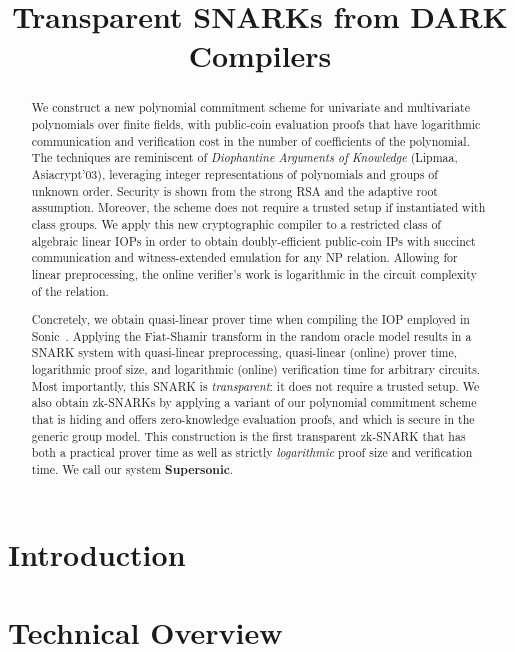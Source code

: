 \documentclass{llncs}
\date{}
\begin{document}
\title{Transparent SNARKs from DARK Compilers}
\author{}
\institute{}
\maketitle

\begin{abstract} 
We construct a new polynomial commitment scheme for univariate and multivariate polynomials over finite fields, with public-coin evaluation proofs that have logarithmic communication and verification cost in the number of coefficients of the polynomial. The techniques are reminiscent of \emph{Diophantine Arguments of Knowledge} (Lipmaa, Asiacrypt'03), leveraging integer representations of polynomials and groups of unknown order. Security is shown from the strong RSA and the adaptive root assumption. Moreover, the scheme does not require a trusted setup if instantiated with class groups. We apply this new cryptographic compiler to a restricted class of algebraic linear IOPs in order to obtain doubly-efficient public-coin IPs with succinct communication and witness-extended emulation for any NP relation. Allowing for linear preprocessing, the online verifier's work is logarithmic in the circuit complexity of the relation.

Concretely, we obtain quasi-linear prover time when compiling the IOP employed in Sonic~\cite{Sonic}. Applying the Fiat-Shamir transform in the random oracle model results in a SNARK system with quasi-linear preprocessing, quasi-linear (online) prover time, logarithmic proof size, and logarithmic (online) verification time for arbitrary circuits. Most importantly, this SNARK is \emph{transparent}: it does not require a trusted setup. We also obtain zk-SNARKs by applying a variant of our polynomial commitment scheme that is hiding and offers zero-knowledge evaluation proofs, and which is secure in the generic group model. This construction is the first transparent zk-SNARK that has both a practical prover time as well as strictly \emph{logarithmic} proof size and verification time. We call our system \textsf{\textbf{Supersonic}}.

\end{abstract} 

\section{Introduction}
 
\section{Technical Overview}

\end{document}
